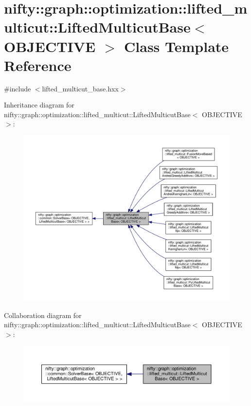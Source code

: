 \hypertarget{classnifty_1_1graph_1_1optimization_1_1lifted__multicut_1_1LiftedMulticutBase}{}\section{nifty\+:\+:graph\+:\+:optimization\+:\+:lifted\+\_\+multicut\+:\+:Lifted\+Multicut\+Base$<$ O\+B\+J\+E\+C\+T\+I\+V\+E $>$ Class Template Reference}
\label{classnifty_1_1graph_1_1optimization_1_1lifted__multicut_1_1LiftedMulticutBase}


{\ttfamily \#include $<$lifted\+\_\+multicut\+\_\+base.\+hxx$>$}



Inheritance diagram for nifty\+:\+:graph\+:\+:optimization\+:\+:lifted\+\_\+multicut\+:\+:Lifted\+Multicut\+Base$<$ O\+B\+J\+E\+C\+T\+I\+V\+E $>$\+:\nopagebreak
\begin{figure}[H]
\begin{center}
\leavevmode
\includegraphics[width=350pt]{classnifty_1_1graph_1_1optimization_1_1lifted__multicut_1_1LiftedMulticutBase__inherit__graph}
\end{center}
\end{figure}


Collaboration diagram for nifty\+:\+:graph\+:\+:optimization\+:\+:lifted\+\_\+multicut\+:\+:Lifted\+Multicut\+Base$<$ O\+B\+J\+E\+C\+T\+I\+V\+E $>$\+:\nopagebreak
\begin{figure}[H]
\begin{center}
\leavevmode
\includegraphics[width=350pt]{classnifty_1_1graph_1_1optimization_1_1lifted__multicut_1_1LiftedMulticutBase__coll__graph}
\end{center}
\end{figure}
